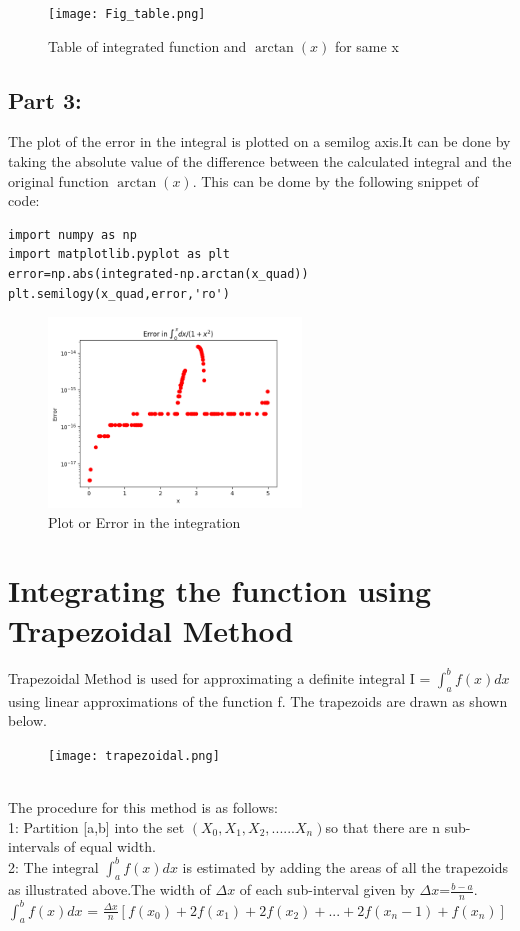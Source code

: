 \documentclass[11pt, a3paper]{article}
\begin{document}
\begin{figure}[h!]
  \texttt{[image: Fig\_table.png]}
  \caption{Table of integrated function and $\arctan(x)$ for same x}
\end{figure}



\subsection{Part 3:}
The plot of the error in the integral is plotted on a semilog axis.It can be done by taking the absolute value of the difference between the calculated integral and the original function $\arctan(x)$. This can be dome by the following snippet of code:\\
\begin{verbatim}
import numpy as np
import matplotlib.pyplot as plt
error=np.abs(integrated-np.arctan(x_quad))
plt.semilogy(x_quad,error,'ro')
\end{verbatim}
\begin{figure}[h!]
  \includegraphics[width=0.6\textwidth, center]{Fig3.png}
  \caption{Plot or Error in the integration}
\end{figure}

\section{Integrating the function using Trapezoidal Method}
Trapezoidal Method is used for approximating a definite integral  I = $\int_{a}^{b} f(x)dx$ using linear approximations of the function f.
The trapezoids are drawn as shown below.\\
\begin{figure}[h!]
  \texttt{[image: trapezoidal.png]}
\end{figure}\\
The procedure for this method is as follows:\\
1: Partition [a,b] into the set $(X_0,X_1,X_2,......X_n) $so that there are n sub-intervals of equal width.\\
2: The integral $\int_{a}^{b} f(x)dx$ is estimated by adding the areas of all the trapezoids as illustrated above.The width of $\Delta{x}$ of each sub-interval given by $\Delta{x}$=$\frac{b-a}{n}$.\\
$\int_{a}^{b} f(x)dx$ = $\frac{\Delta{x}}{n} [ f(x_0)+2f(x_1)+2f(x_2)+...+2f(x_n-1)+f(x_n) ]$\\
\end{document}
